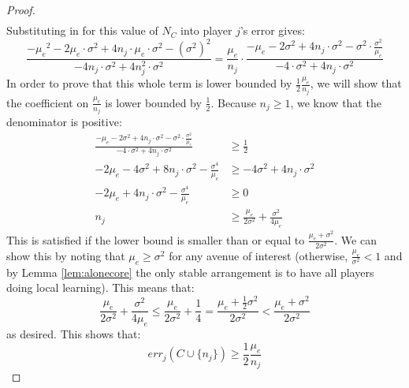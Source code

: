 \documentclass{article}
\newcommand{\cd}[0]{\cdot}
\newcommand{\mue}[0]{\ensuremath{\mu_e}}
\newcommand{\var}[0]{\ensuremath{\sigma^2}}
\newcommand{\ndraw}[0]{\ensuremath{n}}
\newcommand{\total}[0]{\ensuremath{N}}
\newcommand{\col}[0]{\ensuremath{C}}
\begin{document}
\begin{proof}
\begin{align*}
\end{align*}
Substituting in for this value of $\total_{\col}$ into player $j$'s error gives: 
$$\frac{-\mue^2 - 2 \mue \cd \var +4 \ndraw_j \cd \mue \cd \var -(\var)^2}{-4 \ndraw_j \cd \var +4 \ndraw_j^2 \cd \var} = \frac{\mue}{\ndraw_j} \cd \frac{-\mue- 2 \var +4 \ndraw_j \cd  \var -\var \cd \frac{\var}{\mue}}{-4 \cd \var +4 \ndraw_j \cd \var}$$
In order to prove that this whole term is lower bounded by $\frac{1}{2} \frac{\mue}{\ndraw_j}$, we will show that the coefficient on $\frac{\mue}{\ndraw_j}$ is lower bounded by $\frac{1}{2}$. Because $\ndraw_j\geq 1$, we know that the denominator is positive:
\begin{align*}
\frac{-\mue- 2 \var +4 \ndraw_j \cd  \var -\var \cd \frac{\var}{\mue}}{-4 \cd \var +4 \ndraw_j \cd \var} &\geq \frac{1}{2}  \\
-2 \mue -4 \var  + 8 \ndraw_j \cd \var - \frac{\sigma^4}{\mue} &\geq -4 \var + 4 \ndraw_j \cd \var \\
-2 \mue + 4 \ndraw_j \cd \var - \frac{\sigma^4}{\mue} &\geq 0\\
\ndraw_j &\geq \frac{\mue}{2\var} + \frac{\var}{4\mue}
\end{align*}
This is satisfied if the lower bound is smaller than or equal to $\frac{\mue + \var}{2\var}$. We can show this by noting that $\mue \geq \var$ for any avenue of interest (otherwise, $\frac{\mue}{\var} < 1$ and by Lemma \ref{lem:alonecore} the only stable arrangement is to have all players doing local learning). This means that: 
$$\frac{\mue}{2\var} + \frac{\var}{4\mue}\leq \frac{\mue}{2\var} + \frac{1}{4}  = \frac{\mue + \frac{1}{2} \var}{2\var} < \frac{\mue + \var}{2\var}$$
as desired. This shows that: 
$$err_j(\col \cup \{\ndraw_j\}) \geq \frac{1}{2}\frac{\mue}{\ndraw_j} $$
\end{proof}

\twcspec*
\end{document}
